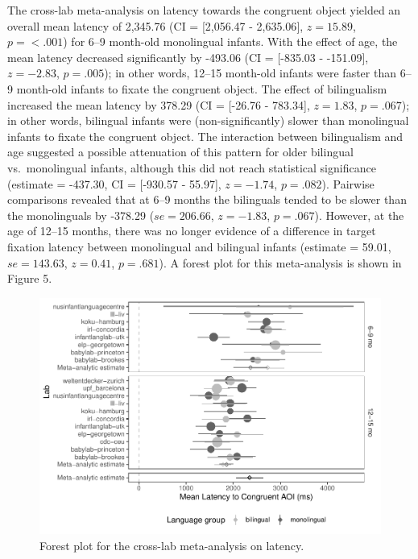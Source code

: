 \documentclass[,man,floatsintext]{apa6}
\begin{document}
The cross-lab meta-analysis on latency towards the congruent object yielded an overall mean latency of 2,345.76 (CI = {[}2,056.47 - 2,635.06{]}, \(z = 15.89\), \(p = < .001\)) for 6--9 month-old monolingual infants. With the effect of age, the mean latency decreased significantly by -493.06 (CI = {[}-835.03 - -151.09{]}, \(z = -2.83\), \(p = .005\)); in other words, 12--15 month-old infants were faster than 6--9 month-old infants to fixate the congruent object. The effect of bilingualism increased the mean latency by 378.29 (CI = {[}-26.76 - 783.34{]}, \(z = 1.83\), \(p = .067\)); in other words, bilingual infants were (non-significantly) slower than monolingual infants to fixate the congruent object. The interaction between bilingualism and age suggested a possible attenuation of this pattern for older bilingual vs.~monolingual infants, although this did not reach statistical significance (estimate = -437.30, CI = {[}-930.57 - 55.97{]}, \(z = -1.74\), \(p = .082\)). Pairwise comparisons revealed that at 6--9 months the bilinguals tended to be slower than the monolinguals by -378.29 (\(se = 206.66\), \(z = -1.83\), \(p = .067\)). However, at the age of 12--15 months, there was no longer evidence of a difference in target fixation latency between monolingual and bilingual infants (estimate = 59.01, \(se = 143.63\), \(z = 0.41\), \(p = .681\)). A forest plot for this meta-analysis is shown in Figure 5.

\begin{figure}
\centering
\includegraphics{gaze-following-paper_files/figure-latex/fig5-1.pdf}
\caption{\label{fig:fig5}Forest plot for the cross-lab meta-analysis on latency.}
\end{figure}
\end{document}

